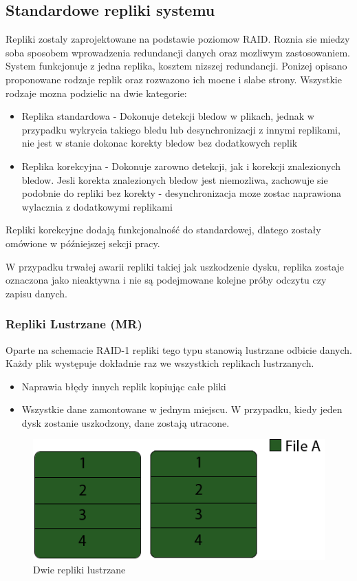 \subsection{Standardowe repliki systemu}
Repliki zostaly zaprojektowane na podstawie poziomow RAID. Roznia sie miedzy soba sposobem wprowadzenia redundancji danych oraz mozliwym zastosowaniem. System funkcjonuje z jedna replika, kosztem nizszej redundancji. Ponizej opisano proponowane rodzaje replik oraz rozwazono ich mocne i slabe strony. Wszystkie rodzaje mozna podzielic na dwie kategorie:
\begin{itemize}
    \item Replika standardowa - Dokonuje detekcji bledow w plikach, jednak w przypadku wykrycia takiego bledu lub desynchronizacji z innymi replikami, nie jest w stanie dokonac korekty bledow bez dodatkowych replik
    \item Replika korekcyjna - Dokonuje zarowno detekcji, jak i korekcji znalezionych bledow. Jesli korekta znalezionych bledow jest niemozliwa, zachowuje sie podobnie do repliki bez korekty - desynchronizacja moze zostac naprawiona wylacznia z dodatkowymi replikami
\end{itemize}
Repliki korekcyjne dodają funkcjonalność do standardowej, dlatego zostały omówione w późniejszej sekcji pracy. 

W przypadku trwałej awarii repliki takiej jak uszkodzenie dysku, replika zostaje oznaczona jako nieaktywna i nie są podejmowane kolejne próby odczytu czy zapisu danych.
\subsubsection{Repliki Lustrzane (MR)}
Oparte na schemacie RAID-1 repliki tego typu stanowią lustrzane odbicie danych. Każdy plik występuje dokładnie raz we wszystkich replikach lustrzanych.
\begin{itemize}
        \item Naprawia błędy innych replik kopiując całe pliki
        \item Wszystkie dane zamontowane w jednym miejscu. W przypadku, kiedy jeden dysk zostanie uszkodzony, dane zostają utracone.
\end{itemize}

\begin{figure}[h!]
        \centering
        \includegraphics{raid-1.png}
        \caption{Dwie repliki lustrzane}
        \label{fig:raid1}
\end{figure}

